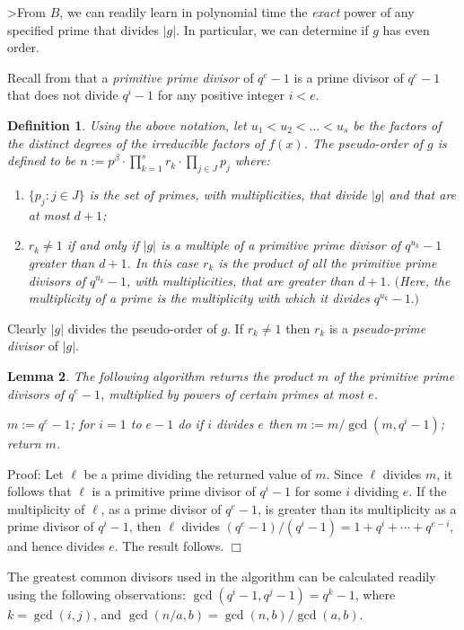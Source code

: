 \documentclass[12pt]{article}
\newtheorem{definition}{Definition}[section]
\newtheorem{lemma}[definition]{Lemma}
\newenvironment{proof}{\normalsize {\sc Proof}:}{{\hfill $\Box$ \\}}
\begin{document}
>From $B$, we can readily learn in polynomial time
the {\it exact} power of any specified prime
that divides $|g|$.  In particular, we can
determine if $g$ has even order.

Recall from \cite{NP} that
a {\it primitive prime divisor} of $q^e-1$ is a prime divisor of
$q^e-1$ that does not divide $q^i-1$ for any positive integer $i<e$.

\begin{definition}
Using the above notation, let $u_1 < u_2 < \ldots <u_s$
be the factors of the distinct degrees
of the irreducible factors of $f(x)$.
The pseudo-order of $g$ is defined to be
$n := p^\beta \cdot \prod_{k= 1}^s r_{k} \cdot \prod_{j \in J} p_j$
 where:
\begin{enumerate}
\item[\rm (i)] $\{p_j : j \in J\}$ is the set of primes,
with multiplicities, that divide $|g|$ and that are at most $d + 1$;
\item[\rm (ii)] $r_k \neq 1$ if and only if
$|g|$ is a multiple of a primitive prime divisor of $q^{u_k}-1$
greater than $d+1$.
In this case $r_k$ is the product of
all the primitive prime divisors of $q^{u_k} - 1$,
with multiplicities, that are greater than $d + 1$.
$($Here, the multiplicity of a prime is the multiplicity with
which it divides $q^{u_k} - 1.)$
\end{enumerate}
\end{definition}
Clearly $|g|$ divides the pseudo-order of $g$.
If $r_k\ne 1$ then $r_k$ is a {\it pseudo-prime divisor} of $|g|$.

\begin{lemma} \label{factorise} The following algorithm returns the
product $m$ of the primitive prime divisors of $q^e-1$, multiplied
by powers of certain primes at most $e$.

\noindent
{
$m := q^e-1$; for $i=1$ to $e - 1$ do
if $i$ divides $e$ then $m:=m/\gcd(m, q^i-1)$;  return $m$.
}
\end{lemma}
\begin{proof}
Let $\ell$ be a prime dividing the returned value of $m$.  Since $\ell$
divides $m$, it follows that $\ell$ is a primitive prime divisor of
$q^i-1$ for some $i$ dividing $e$.  If 
the multiplicity of $\ell$, as a prime divisor of $q^e-1$, is
greater than its multiplicity as a prime divisor of $q^i-1$, 
then $\ell$ divides $(q^e-1)/(q^i-1)=1+q^i+\cdots+q^{e-i}$,
and hence divides $e$.  
The result follows.
\end{proof}

The greatest common divisors used in the
algorithm can be calculated readily
using the following observations:  $\gcd(q^i-1,q^j-1)=q^k-1$,
where $k=\gcd(i,j)$, and $\gcd(n/a,b)=\gcd(n,b)/\gcd(a,b)$.
\end{document}
